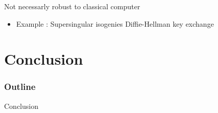 \documentclass{beamer}
\begin{document}
\begin{frame}{Not necessarly robust to classical computer}
	\begin{itemize}
		\item Example : Supersingular isogenies Diffie-Hellman key exchange
	\end{itemize}
\end{frame}

\section{Conclusion}
\begin{frame}
  \frametitle{Outline}
  \tableofcontents[currentsection]
\end{frame}
\begin{frame}{Conclusion}
\begin{linenumbers}
\end{linenumbers}
\end{frame}
\end{document}
